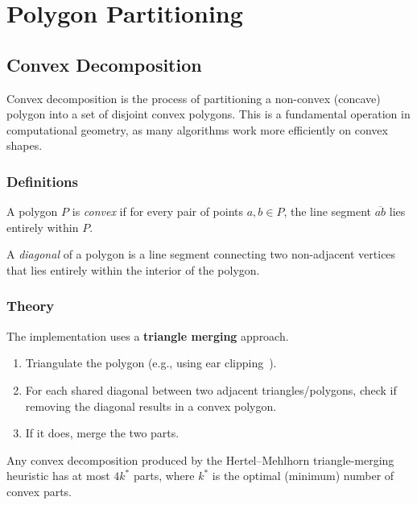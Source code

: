 \chapter{Polygon Partitioning}
\label{ch:polygon_partitioning}

\section{Convex Decomposition}
\label{sec:convex_decomposition}

Convex decomposition is the process of partitioning a non-convex (concave) polygon into a set of disjoint convex polygons. This is a fundamental operation in computational geometry, as many algorithms work more efficiently on convex shapes.

\subsection{Definitions}

\begin{definition}\label{def:convex_polygon}
A polygon $P$ is \emph{convex} if for every pair of points $a, b \in P$, the line segment $\overline{ab}$ lies entirely within $P$.
\end{definition}

\begin{definition}[Diagonal]\label{def:diagonal}
A \emph{diagonal} of a polygon is a line segment connecting two non-adjacent vertices that lies entirely within the interior of the polygon.
\end{definition}

\subsection{Theory}

The implementation uses a \textbf{triangle merging} approach.
\begin{enumerate}
\item Triangulate the polygon (e.g., using ear clipping~\cite{meisters1975}).
\item For each shared diagonal between two adjacent triangles/polygons, check if removing the diagonal results in a convex polygon.
\item If it does, merge the two parts.
\end{enumerate}

\begin{theorem}\label{thm:hertel_mehlhorn}
Any convex decomposition produced by the Hertel--Mehlhorn triangle-merging heuristic has at most $4k^*$ parts, where $k^*$ is the optimal (minimum) number of convex parts.
\end{theorem}

